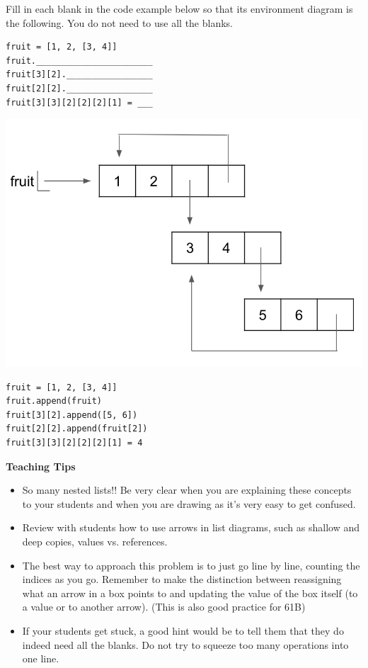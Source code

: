 \begin{blocksection}
\question Fill in each blank in the code example below so that its environment diagram is the following. You do not need to use all the blanks.

\begin{multicols}{2}
\begin{lstlisting}
fruit = [1, 2, [3, 4]]
fruit._______________________
fruit[3][2]._________________
fruit[2][2]._________________
fruit[3][3][2][2][2][1] = ___
\end{lstlisting}

\columnbreak
\includegraphics[width=.45\textwidth]{fruit_loops.png}
\end{multicols}

\begin{solution}[2in]
\begin{lstlisting}
fruit = [1, 2, [3, 4]]
fruit.append(fruit)
fruit[3][2].append([5, 6])
fruit[2][2].append(fruit[2])
fruit[3][3][2][2][2][1] = 4
\end{lstlisting}
\end{solution}
\end{blocksection}

\begin{blocksection}
\begin{guide}
\textbf{Teaching Tips}
\begin{itemize}
	\item So many nested lists!! Be very clear when you are explaining these concepts to your students and when you are drawing as it's very easy to get confused.
	\item Review with students how to use arrows in list diagrams, such as shallow and deep copies, values vs. references.
	\item The best way to approach this problem is to just go line by line, counting the indices as you go. Remember to make the distinction between reassigning what an arrow in a box points to and updating the value of the box itself (to a value or to another arrow). (This is also good practice for 61B)
	\item If your students get stuck, a good hint would be to tell them that they do indeed need all the blanks. Do not try to squeeze too many operations into one line.
\end{itemize}
\end{guide}
\end{blocksection}
